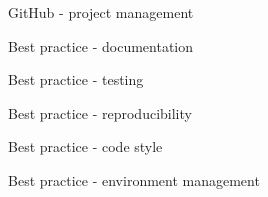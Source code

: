 \documentclass{beamer} %
\begin{document}
  \begin{frame}{GitHub - project management}
  \end{frame}

  \begin{frame}{Best practice - documentation}
  \end{frame}

  \begin{frame}{Best practice - testing}
  \end{frame}

  \begin{frame}{Best practice - reproducibility}
  \end{frame}

  \begin{frame}{Best practice - code style}
  \end{frame}

  \begin{frame}{Best practice - environment management}
  \end{frame}
\end{document}
